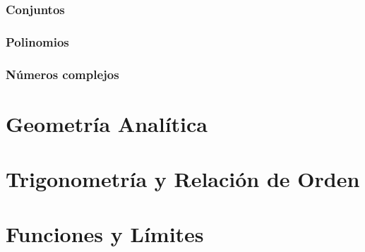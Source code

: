 \documentclass[11pt, twoside]{book}
\begin{document}
\subsection*{Conjuntos}
\subsection*{Polinomios}
\subsection*{Números complejos}


\chapter{Geometría Analítica}

\chapter{Trigonometría y Relación de Orden}

\chapter{Funciones y Límites}



\printindex

\begin{titlepage}

    \makebox[0pt][l]{\rule{1.3\textwidth}{0pt}}
    \par
    \pagecolor{ustmidgreen}

    \noindent
\end{titlepage}

\nopagecolor
\end{document}
